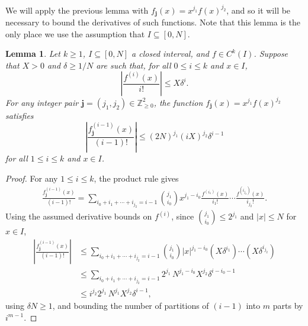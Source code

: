 \documentclass[12pt]{amsart}
\newcommand{\Z}{{\mathbb Z}}
\newcommand{\1}{{\mathbf 1}}
\newtheorem{lemma}[theorem]{Lemma}
\theoremstyle{remark}
\theoremstyle{definition}
\begin{document}
We will apply the previous lemma with $f_\mathbf{j}(x)=x^{j_1}f(x)^{j_2}$, and so it will be necessary to bound the derivatives of such functions. Note that this lemma is the only place we use the assumption that $I\subseteq [0,N]$. 
\begin{lemma}\label{prop:normmult}
Let $k\ge1$, $I\subseteq [0,N]$ a closed interval, and $f\in C^k(I)$. Suppose that $X>0$ and $\delta\geq 1/N$ are such that, for all $0\leq i\leq k$ and $x\in I$,
\[\left\lvert \frac{f^{(i)}(x)}{i!}\right\rvert\leq X\delta^i.\]
For any integer pair $\mathbf{j}=(j_1,j_2)\in \Z_{\ge0}^2$, the function $f_\mathbf{j}(x)=x^{j_1}f(x)^{j_2}$ satisfies
\[\left\lvert \frac{f_\mathbf{j}^{(i-1)}(x)}{(i-1)!}\right\rvert \leq (2N)^{j_1}(iX)^{j_2}\delta^{i-1} \]
for all $1\leq i\leq k$ and $x \in I$.
\end{lemma}
\begin{proof}
For any $1\leq i\le k$, the product rule gives
\begin{align*}
\frac{f_\mathbf{j}^{(i-1)}(x)}{(i-1)!}=\sum_{i_0+i_1+\cdots+i_{j_2}=i-1}\binom{j_1}{i_0}x^{j_1-i_0}\frac{f^{(i_1)}(x)}{i_1!}\cdots \frac{f^{(i_{j_2})}(x)}{i_{j_2}!}.
\end{align*}
Using the assumed derivative bounds on $f^{(i)}$, since $\binom{j_1}{i_0}\leq 2^{j_1}$ and $\lvert x\rvert \leq N$ for $x\in I$, 
\begin{align*}
\left\lvert\frac{f_\mathbf{j}^{(i-1)}(x)}{(i-1)!}\right\rvert 
& \le \sum_{i_0+i_1+\cdots+i_{j_2}=i-1}\binom{j_1}{i_0} |x|^{j_1-i_0} (X\delta^{i_1})\cdots(X\delta^{i_{j_2}}) \\
& \leq  \sum_{i_0+i_1+\cdots+i_{j_2}=i-1} 2^{j_1}\, N^{j_1-i_0} X^{j_2} \delta^{i-i_0-1}\\
& \leq  i^{j_2} 2^{j_1}\, N^{j_1} X^{j_2} \delta^{i-1},
\end{align*}
using $\delta N\geq 1$, and bounding the number of partitions of $(i-1)$ into $m$ parts by $i^{m-1}$.
\end{proof}
\end{document}
